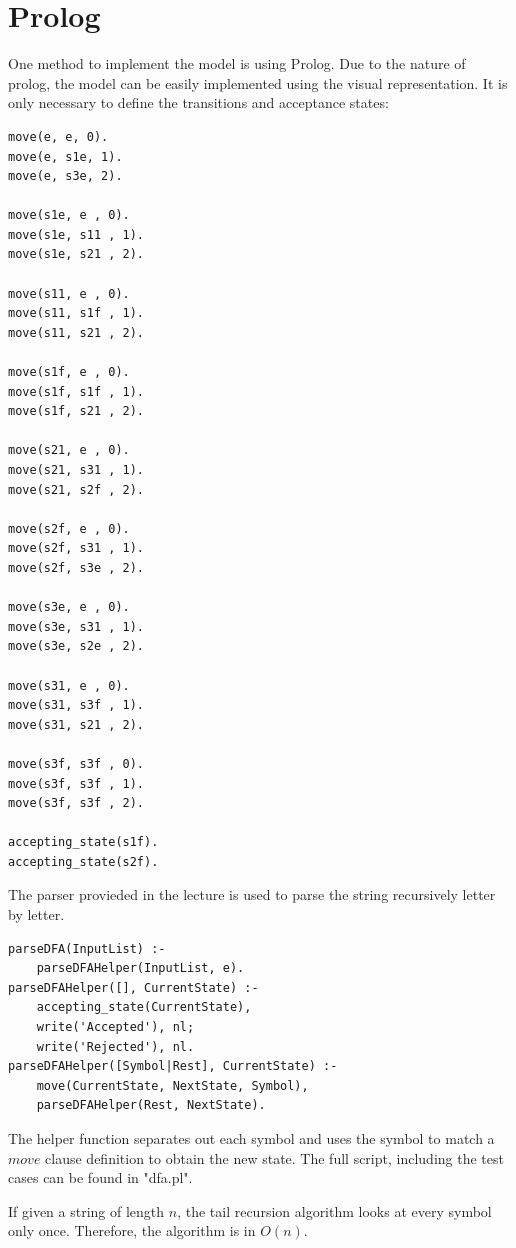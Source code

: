 \documentclass{article}
\begin{document}
\section{Prolog}
One method to implement the model is using Prolog. Due to the nature of prolog,
the model can be easily implemented using the visual representation.
It is only necessary to define the transitions and acceptance states:
\begin{lstlisting}
move(e, e, 0).
move(e, s1e, 1).
move(e, s3e, 2).

move(s1e, e , 0).
move(s1e, s11 , 1).
move(s1e, s21 , 2).

move(s11, e , 0).
move(s11, s1f , 1).
move(s11, s21 , 2).

move(s1f, e , 0).
move(s1f, s1f , 1).
move(s1f, s21 , 2).

move(s21, e , 0).
move(s21, s31 , 1).
move(s21, s2f , 2).

move(s2f, e , 0).
move(s2f, s31 , 1).
move(s2f, s3e , 2).

move(s3e, e , 0).
move(s3e, s31 , 1).
move(s3e, s2e , 2).

move(s31, e , 0).
move(s31, s3f , 1).
move(s31, s21 , 2).

move(s3f, s3f , 0).
move(s3f, s3f , 1).
move(s3f, s3f , 2).

accepting_state(s1f).
accepting_state(s2f).
\end{lstlisting}

The parser provieded in the lecture is used to parse the string recursively letter by letter.
\begin{lstlisting}
parseDFA(InputList) :-
    parseDFAHelper(InputList, e).
parseDFAHelper([], CurrentState) :-
    accepting_state(CurrentState),
    write('Accepted'), nl;
    write('Rejected'), nl.
parseDFAHelper([Symbol|Rest], CurrentState) :-
    move(CurrentState, NextState, Symbol),
    parseDFAHelper(Rest, NextState).
\end{lstlisting}
The helper function separates out each symbol and uses the symbol to match a
$move$ clause definition to obtain the new state.
The full script, including the test cases can be found in "dfa.pl".

If given a string of length $n$, the tail recursion algorithm looks at every symbol only once.
Therefore, the algorithm is in $O(n)$.
\end{document}

